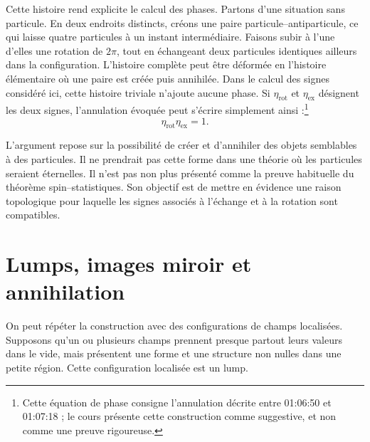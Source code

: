 Cette histoire rend explicite le calcul des phases. Partons d’une situation sans particule. En deux endroits distincts, créons une paire particule--antiparticule, ce qui laisse quatre particules à un instant intermédiaire. Faisons subir à l’une d’elles une rotation de \(2\pi\), tout en échangeant deux particules identiques ailleurs dans la configuration. L’histoire complète peut être déformée en l’histoire élémentaire où une paire est créée puis annihilée. Dans le calcul des signes considéré ici, cette histoire triviale n’ajoute aucune phase. Si \(\eta_{\mathrm{rot}}\) et \(\eta_{\mathrm{ex}}\) désignent les deux signes, l’annulation évoquée peut s’écrire simplement ainsi :\footnote{Cette équation de phase consigne l’annulation décrite entre 01:06:50 et 01:07:18 ; le cours présente cette construction comme suggestive, et non comme une preuve rigoureuse.}
\begin{equation}
\eta_{\mathrm{rot}}\eta_{\mathrm{ex}}=1.
\end{equation}

\begin{classroomqa}
\end{classroomqa}

L’argument repose sur la possibilité de créer et d’annihiler des objets semblables à des particules. Il ne prendrait pas cette forme dans une théorie où les particules seraient éternelles. Il n’est pas non plus présenté comme la preuve habituelle du théorème spin--statistiques. Son objectif est de mettre en évidence une raison topologique pour laquelle les signes associés à l’échange et à la rotation sont compatibles.

\section{Lumps, images miroir et annihilation}

On peut répéter la construction avec des configurations de champs localisées. Supposons qu’un ou plusieurs champs prennent presque partout leurs valeurs dans le vide, mais présentent une forme et une structure non nulles dans une petite région. Cette configuration localisée est un lump.

